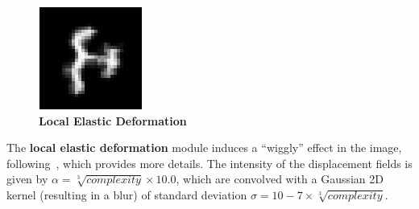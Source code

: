\documentclass{article} %
\begin{document}
\begin{minipage}[t]{\linewidth}
\begin{figure}
\begin{center}
\vspace*{-4mm}
\includegraphics[scale=.4]{images/Localelasticdistorsions_only.png}\\
{\bf Local Elastic Deformation}
\end{center}
\end{figure}
The {\bf local elastic deformation}
module induces a ``wiggly'' effect in the image, following~\citet{SimardSP03-short},
which provides more details. 
The intensity of the displacement fields is given by 
$\alpha = \sqrt[3]{complexity} \times 10.0$, which are 
convolved with a Gaussian 2D kernel (resulting in a blur) of
standard deviation $\sigma = 10 - 7 \times\sqrt[3]{complexity}$.
\end{minipage}

\vspace*{7mm}
\end{document}
